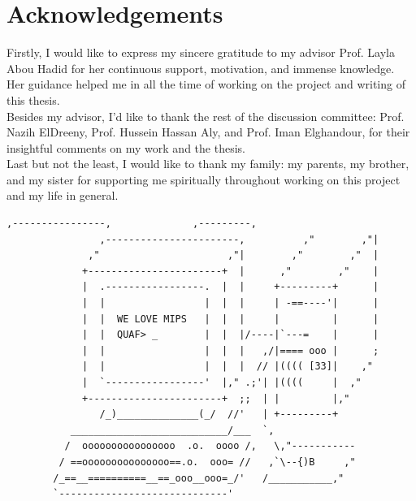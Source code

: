 \documentclass[oneside]{book}
\begin{document}

\newpage
\thispagestyle{plain}
\chapter{Acknowledgements}

Firstly, I would like to express my sincere gratitude to my advisor
Prof. Layla Abou Hadid for her continuous support, motivation, and
immense knowledge. Her guidance helped me in all the time of working
on the project and writing of this thesis. \\

Besides my advisor, I'd like to thank the rest of the discussion committee:
Prof. Nazih ElDreeny,
Prof. Hussein Hassan Aly, and
Prof. Iman Elghandour,
for their insightful comments on my work and the thesis.\\


Last but not the least, I would like to thank my family: my parents,
my brother, and my sister for supporting me spiritually throughout working
on this project and my life in general.


\newpage
\thispagestyle{plain}
\vspace*{\fill}
\bfseries
\begin{Verbatim}[showspaces=false,fontsize=\small]
                     ,----------------,              ,---------,
                ,-----------------------,          ,"        ,"|
              ,"                      ,"|        ,"        ,"  |
             +-----------------------+  |      ,"        ,"    |
             |  .-----------------.  |  |     +---------+      |
             |  |                 |  |  |     | -==----'|      |
             |  |  WE LOVE MIPS   |  |  |     |         |      |
             |  |  QUAF> _        |  |  |/----|`---=    |      |
             |  |                 |  |  |   ,/|==== ooo |      ;
             |  |                 |  |  |  // |(((( [33]|    ,"
             |  `-----------------'  |," .;'| |((((     |  ,"
             +-----------------------+  ;;  | |         |,"
                /_)______________(_/  //'   | +---------+
           ___________________________/___  `,
          /  oooooooooooooooo  .o.  oooo /,   \,"-----------
         / ==ooooooooooooooo==.o.  ooo= //   ,`\--{)B     ,"
        /_==__==========__==_ooo__ooo=_/'   /___________,"
        `-----------------------------'
\end{Verbatim}
\normalfont
\vspace*{\fill}
\end{document}
